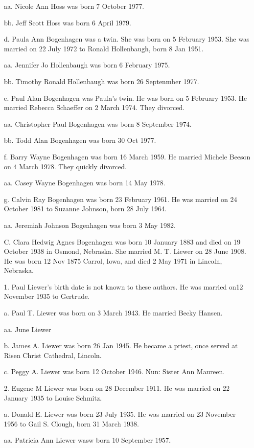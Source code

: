 \documentclass[a4paper]{article}
\begin{document}
aa. Nicole Ann Hoss was born 7 October 1977.

bb. Jeff Scott Hoss was born 6 April 1979.

d. Paula Ann Bogenhagen was a twin.  She was born on 5 February 1953. She was married on 22 July 1972 to Ronald Hollenbaugh, born 8 Jan 1951.

aa. Jennifer Jo Hollenbaugh was born 6 February 1975.

bb. Timothy Ronald Hollenbaugh was born 26 Septenmber 1977.
		
e. Paul Alan Bogenhagen was Paula's twin.  He was born on 5 February 1953.  He married Rebecca Schaeffer on 2 March 1974.  They divorced.

aa. Christopher Paul Bogenhagen was born 8 September 1974.

bb. Todd Alan Bogenhagen was born 30 Oct 1977.

f. Barry Wayne Bogenhagen was born 16 March 1959.  He married Michele Beeson on 4 March 1978.  They quickly divorced.

aa. Casey Wayne Bogenhagen was born 14 May 1978.

g. Calvin Ray Bogenhagen was born 23 February 1961.  He was married on 24 October 1981 to Suzanne Johnson, born 28 July 1964. 

aa. Jeremiah Johnson Bogenhagen was born 3 May 1982.

C.  Clara Hedwig Agnes Bogenhagen was born 10 January 1883 and died on 19 October 1938 in Osmond, Nebraska.  She married M. T. Liewer on 28 June 1908.  He was born 12 Nov 1875 Carrol, Iowa, and died 2 May 1971 in Lincoln, Nebraska.

1. Paul Liewer's birth date is not known to these authors.  He was married on12 November 1935 to Gertrude.

a. Paul T. Liewer was born on 3 March 1943.  He married Becky Hansen.

aa. June Liewer

b. James A. Liewer was born 26 Jan 1945.  He became a priest, once served at Risen Christ Cathedral, Lincoln.

c. Peggy A. Liewer was born 12 October 1946.  Nun: Sister Ann Maureen.

2. Eugene M Liewer was born on 28 December 1911.  He was married on 22 January 1935 to Louise Schmitz.

a. Donald E. Liewer was born 23 July 1935.  He was married on 23 November 1956 to Gail S. Clough, born 31 March 1938.

aa. Patricia Ann Liewer wasw born 10 September 1957.
\end{document}
